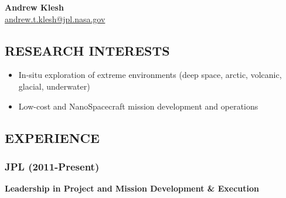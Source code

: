 \documentclass[11pt,letterpaper]{article}
\begin{document}
\begin{center}
    {\Huge\bfseries Andrew Klesh} \\[0.3em]
    {\large \href{mailto:andrew.t.klesh@jpl.nasa.gov}{andrew.t.klesh@jpl.nasa.gov}}
\end{center}

\vspace{0.5em}

\subsection*{RESEARCH INTERESTS}
\begin{itemize}
\item In-situ exploration of extreme environments (deep space, arctic, volcanic, glacial, underwater)
\item Low-cost and NanoSpacecraft mission development and operations
\end{itemize}

\subsection*{EXPERIENCE}
\subsubsection*{JPL (2011-Present)}
\textbf{Leadership in Project and Mission Development \& Execution}
\end{document}

